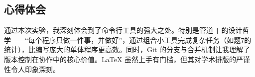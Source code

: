 \documentclass[12pt,a4paper]{article}
\begin{document}
\subsection{心得体会}
通过本次实验，我深刻体会到了命令行工具的强大之处。特别是管道 \texttt{|} 的设计哲学——“每个程序只做一件事，并做好”，通过组合小工具完成复杂任务（如题7的统计），比编写庞大的单体程序更高效。同时，Git 的分支与合并机制让我理解了版本控制在协作中的核心价值。LaTeX 虽然上手有门槛，但其对学术排版的严谨性令人印象深刻。
\end{document}
